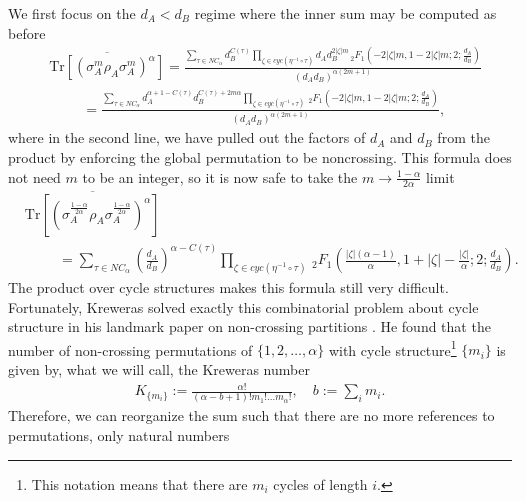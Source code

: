 \documentclass[a4paper,11pt]{article}
\newcommand{\Tr}{\text{Tr}}
\newcommand*{\JKF}[1]{\textcolor{blue}{[JKF: #1]}}
\newcommand*{\SR}[1]{\textcolor{magenta}{[SR: \textsf{#1}]}}
\begin{document}
We first focus on the $d_A < d_B$ regime where the inner sum may be computed as before
\begin{align}
    &\overline{\Tr \left[ \left(\sigma_A^{m}\rho_A \sigma_A^{m}\right)^{\alpha}\right]}  
    =\frac{\sum_{\tau \in NC_{\alpha}} d_B^{C(\tau)}\prod_{\zeta \in cyc(\eta^{-1}\circ \tau)}d_A d_B^{2 |\zeta| m} \, _2F_1\left(-2 |\zeta| m,1-2 |\zeta|
  m;2;\frac{d_A}{d_B}\right)}{(d_A d_B)^{{\alpha}(2m+1)}}
  \nonumber
  \\
  &\hspace{1cm}=\frac{\sum_{\tau \in NC_{\alpha}} d_A^{\alpha+1-C(\tau)}d_B^{C(\tau)+2m\alpha}\prod_{\zeta \in cyc(\eta^{-1}\circ \tau)}\, _2F_1\left(-2 |\zeta| m,1-2 |\zeta|
  m;2;\frac{d_A}{d_B}\right)}{(d_A d_B)^{{\alpha}(2m+1)}},
\end{align}
where in the second line, we have pulled out the factors of $d_A$ and $d_B$ from the product by enforcing the global permutation to be noncrossing.
This formula does not need $m$ to be an integer, so it is now safe to take the $m \rightarrow \frac{1-\alpha}{2\alpha}$ limit
\begin{align}
    &\overline{\Tr\left[\left(
   {
    \sigma^{\frac{1-\alpha}{2\alpha}}_A
    \rho_A 
    \sigma^{\frac{1-\alpha}{2\alpha}}_A
    }
    \right)^{\alpha}\right]}\nonumber
    \\
    &\hspace{1cm}=\sum_{\tau \in NC_{\alpha}}  \left(\frac{d_A}{d_B}\right)^{{\alpha}-C(\tau)}\prod_{\zeta \in cyc(\eta^{-1}\circ \tau)} \, _2F_1\left(\frac{|\zeta|({\alpha}-1)}{{\alpha}},1+|\zeta|-\frac{|\zeta|}{{\alpha}}
   ;2;\frac{d_A}{d_B}\right).
\end{align}
The product over cycle structures makes this formula still very difficult. Fortunately, Kreweras solved exactly this combinatorial problem about cycle structure in his landmark paper on non-crossing partitions \cite{KREWERAS1972333}. He found that the number of non-crossing permutations of $\{1,2,\dots, \alpha\}$ with cycle structure\footnote{This notation means that there are $m_i$ cycles of length $i$.} $\{m_i\}$ is given by, what we will call, the Kreweras number \cite{KREWERAS1972333, SIMION2000367}
\begin{align}
    K_{\{m_i\}} := \frac{{\alpha}!}{(\alpha-b+1)!m_1!\dots m_{\alpha}!}, \quad b := \sum_im_i.
\end{align}
Therefore, we can reorganize 
the sum such that 
there are no more references to permutations, only natural numbers
\end{document}
